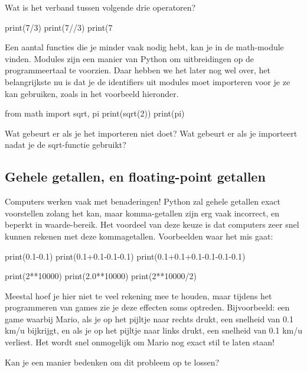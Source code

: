 \documentclass[10pt,a4paper]{article}
\newenvironment{task}{\smallpencil}{}
\newcommand{\optional}{\Info \thinspace}
\begin{document}
\begin{task}
Wat is het verband tussen volgende drie operatoren?
\end{task}
\begin{python}
print(7/3)
print(7//3)
print(7%
\end{python}

Een aantal functies die je minder vaak nodig hebt, kan je in de math-module vinden. Modules zijn een manier van Python om uitbreidingen op de programmeertaal te voorzien. Daar hebben we het later nog wel over, het belangrijkste nu is dat je de identifiers uit modules moet importeren voor je ze kan gebruiken, zoals in het voorbeeld hieronder.
\begin{python}
from math import sqrt, pi
print(sqrt(2))
print(pi)
\end{python}

\begin{task}
Wat gebeurt er als je het importeren niet doet? Wat gebeurt er als je importeert nadat je de sqrt-functie gebruikt?
\end{task}


\subsection{\optional Gehele getallen, en floating-point getallen}
Computers werken vaak met benaderingen! Python zal gehele getallen exact voorstellen zolang het kan, maar komma-getallen zijn erg vaak incorrect, en beperkt in waarde-bereik. Het voordeel van deze keuze is dat computers zeer snel kunnen rekenen met deze kommagetallen. Voorbeelden waar het mis gaat:
\begin{python}
print(0.1-0.1)
print(0.1+0.1-0.1-0.1)
print(0.1+0.1+0.1-0.1-0.1-0.1)

print(2**10000)
print(2.0**10000)
print(2**10000/2)
\end{python}
Meestal hoef je hier niet te veel rekening mee te houden, maar tijdens het programmeren van games zie je deze effecten soms optreden. Bijvoorbeeld: een game waarbij Mario, als je op het pijltje naar rechts drukt, een snelheid van 0.1 km/u bijkrijgt, en als je op het pijltje naar links drukt, een snelheid van 0.1 km/u verliest. Het wordt snel onmogelijk om Mario nog exact stil te laten staan!

\begin{task}
Kan je een manier bedenken om dit probleem op te lossen?
\end{task}
\end{document}
